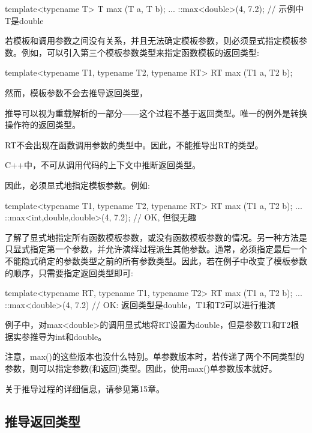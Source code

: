 \begin{cpp}
template<typename T>
T max (T a, T b);
...
::max<double>(4, 7.2); // 示例中T是double
\end{cpp}

若模板和调用参数之间没有关系，并且无法确定模板参数，则必须显式指定模板参数。例如，可以引入第三个模板参数类型来指定函数模板的返回类型:

\begin{cpp}
template<typename T1, typename T2, typename RT>
RT max (T1 a, T2 b);
\end{cpp}

然而，模板参数不会去推导返回类型，

\begin{notice}推导可以视为重载解析的一部分——这个过程不基于返回类型。唯一的例外是转换操作符的返回类型。
\end{notice}

RT不会出现在函数调用参数的类型中。因此，不能推导出RT的类型。

\begin{notice}C++中，不可从调用代码的上下文中推断返回类型。
\end{notice}

因此，必须显式地指定模板参数。例如:

\begin{cpp}
template<typename T1, typename T2, typename RT>
RT max (T1 a, T2 b);
...
::max<int,double,double>(4, 7.2); // OK, 但很无趣
\end{cpp}

了解了显式地指定所有函数模板参数，或没有函数模板参数的情况。另一种方法是只显式指定第一个参数，并允许演绎过程派生其他参数。通常，必须指定最后一个不能隐式确定的参数类型之前的所有参数类型。因此，若在例子中改变了模板参数的顺序，只需要指定返回类型即可:

\begin{cpp}
template<typename RT, typename T1, typename T2>
RT max (T1 a, T2 b);
...
::max<double>(4, 7.2) // OK: 返回类型是double，T1和T2可以进行推演
\end{cpp}

例子中，对max<double>的调用显式地将RT设置为double，但是参数T1和T2根据实参推导为int和double。

注意，max()的这些版本也没什么特别。单参数版本时，若传递了两个不同类型的参数，则可以指定参数(和返回)类型。因此，使用max()单参数版本就好。

关于推导过程的详细信息，请参见第15章。

\subsection{推导返回类型}

